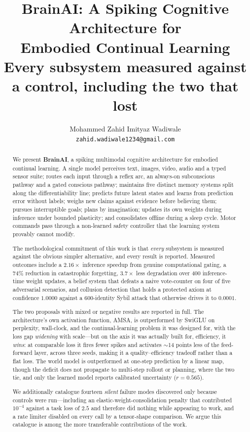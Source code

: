 \documentclass[10pt,twocolumn]{article}
\title{\vspace{-1.5em}\textbf{BrainAI: A Spiking Cognitive Architecture for\\
Embodied Continual Learning}\\[0.35em]
\large Every subsystem measured against a control, including the two that lost}
\author{
  Mohammed Zahid Imityaz Wadiwale\\
  \small \texttt{zahid.wadiwale1234@gmail.com}
}
\date{}
\begin{document}
\maketitle

\begin{abstract}
\noindent
We present \textbf{BrainAI}, a spiking multimodal cognitive architecture for
embodied continual learning. A single model perceives text, images, video,
audio and a typed sensor suite; routes each input through a reflex arc, an
always-on subconscious pathway and a gated conscious pathway; maintains five
distinct memory systems split along the differentiability line; predicts future
latent states and learns from prediction error without labels; weighs new
claims against evidence before believing them; pursues interruptible goals;
plans by imagination; updates its own weights during inference under bounded
plasticity; and consolidates offline during a sleep cycle. Motor commands pass
through a non-learned safety controller that the learning system provably
cannot modify.

The methodological commitment of this work is that \emph{every} subsystem is
measured against the obvious simpler alternative, and every result is reported.
Measured outcomes include a $2.16\times$ inference speedup from genuine
computational gating, a $74\%$ reduction in catastrophic forgetting, $3.7\times$
less degradation over 400 inference-time weight updates, a belief system that
defeats a naive vote-counter on four of five adversarial scenarios, and
collusion detection that holds a protected axiom at confidence $1.0000$ against
a 600-identity Sybil attack that otherwise drives it to $0.0001$.

The two proposals with mixed or negative results are reported in full. The
architecture's own activation function, AMSA, is outperformed by SwiGLU on
perplexity, wall-clock, and the continual-learning problem it was designed for,
with the loss gap \emph{widening} with scale---but on the axis it was actually
built for, efficiency, it \emph{wins}: at comparable loss it fires fewer spikes
and activates $\sim$14 points less of the feed-forward layer, across three seeds,
making it a quality--efficiency tradeoff rather than a flat loss. The world model
is outperformed at one-step prediction by a linear map, though the deficit does
not propagate to multi-step rollout or planning, where the two tie, and only the
learned model reports calibrated uncertainty ($r=0.565$).

We additionally catalogue fourteen \emph{silent} failure modes discovered only
because controls were run---including an elastic-weight-consolidation penalty
that contributed $10^{-4}$ against a task loss of $2.5$ and therefore did
nothing while appearing to work, and a rate limiter disabled on every call by a
tensor-shape comparison. We argue this catalogue is among the more transferable
contributions of the work.
\end{abstract}
\end{document}
